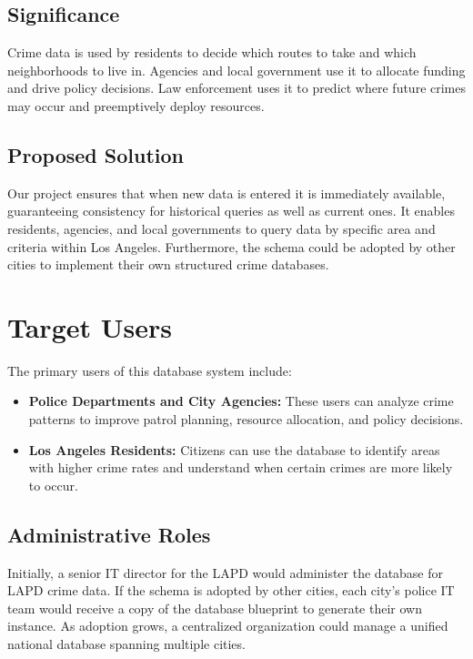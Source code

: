 \documentclass[conference]{IEEEtran}
\begin{document}
\subsection{Significance}
Crime data is used by residents to decide which routes to take and which neighborhoods to live in. Agencies and local government use it to allocate funding and drive policy decisions. Law enforcement uses it to predict where future crimes may occur and preemptively deploy resources.

\subsection{Proposed Solution}
Our project ensures that when new data is entered it is immediately available, guaranteeing consistency for historical queries as well as current ones. It enables residents, agencies, and local governments to query data by specific area and criteria within Los Angeles. Furthermore, the schema could be adopted by other cities to implement their own structured crime databases.

\section{Target Users}

The primary users of this database system include:
\begin{itemize}
    \item \textbf{Police Departments and City Agencies:} These users can analyze crime patterns to improve patrol planning, resource allocation, and policy decisions.
    \item \textbf{Los Angeles Residents:} Citizens can use the database to identify areas with higher crime rates and understand when certain crimes are more likely to occur.
\end{itemize}

\subsection{Administrative Roles}
Initially, a senior IT director for the LAPD would administer the database for LAPD crime data. If the schema is adopted by other cities, each city's police IT team would receive a copy of the database blueprint to generate their own instance. As adoption grows, a centralized organization could manage a unified national database spanning multiple cities.
\end{document}

